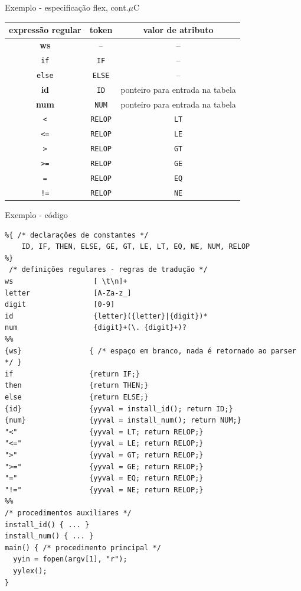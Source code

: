 \begin{frame}{Exemplo - especificação flex, cont.}{$\mu$C}
  \small
  \center
  \begin{tabular}{c|c|c}
    \toprule
    \bf\color{blue} expressão regular
    &\bf\color{blue}  token
    &\bf\color{blue} valor de atributo \\
    \midrule
    {\bf ws} &  --      & -- \\
    {\tt if}   & {\tt IF}  & -- \\
    {\tt else}   & {\tt ELSE}  & -- \\
    {\bf id}   & {\tt ID}  & ponteiro para entrada na tabela \\
    {\bf num}   & {\tt NUM}  & ponteiro para entrada na tabela \\
    {\tt <}   & {\tt RELOP} & {\tt LT} \\
    {\tt <=}   & {\tt RELOP} & {\tt LE} \\
    {\tt >}   & {\tt RELOP} & {\tt GT} \\
    {\tt >=}   & {\tt RELOP} & {\tt GE} \\
    {\tt =}   & {\tt RELOP} & {\tt EQ} \\
    {\tt !=}   & {\tt RELOP} & {\tt NE} \\
    \bottomrule
   \end{tabular}
 \end{frame}

\begin{frame}[fragile]{Exemplo - código}
 \tiny
\begin{lstlisting}
%{ /* declarações de constantes */
    ID, IF, THEN, ELSE, GE, GT, LE, LT, EQ, NE, NUM, RELOP
%}
 /* definições regulares - regras de tradução */
ws                   [ \t\n]+
letter               [A-Za-z_]
digit                [0-9]
id                   {letter}({letter}|{digit})*
num                  {digit}+(\. {digit}+)?
%%
{ws}                { /* espaço em branco, nada é retornado ao parser */ }
if                  {return IF;}
then                {return THEN;}
else                {return ELSE;}
{id}                {yyval = install_id(); return ID;}
{num}               {yyval = install_num(); return NUM;}
"<"                 {yyval = LT; return RELOP;}
"<="                {yyval = LE; return RELOP;}
">"                 {yyval = GT; return RELOP;}
">="                {yyval = GE; return RELOP;}
"="                 {yyval = EQ; return RELOP;}
"!="                {yyval = NE; return RELOP;}
%%
/* procedimentos auxiliares */
install_id() { ... }
install_num() { ... }
main() { /* procedimento principal */
  yyin = fopen(argv[1], "r");
  yylex();
}
\end{lstlisting}
\end{frame}

